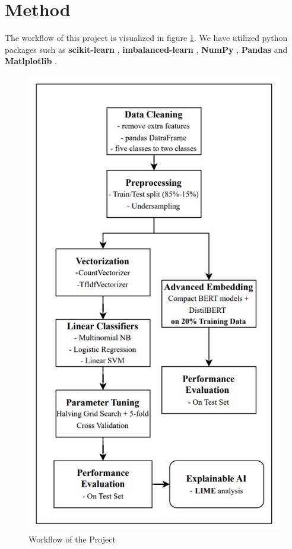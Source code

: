 \documentclass[11pt]{article}
\begin{document}
 \section{Method} 
 The workflow of this project is visualized in figure \ref{fig:workflow}. We have utilized python packages such as \textbf{scikit-learn} \cite{scikit-learn}, \textbf{imbalanced-learn} \cite{imblearn}, \textbf{NumPy} \cite{numpy}, \textbf{Pandas} \cite{pandas} \cite{pandassoft} and \textbf{Matlplotlib} \cite{matplotlib}.
 \begin{figure}
     \centering
     \includegraphics[scale=0.5]{figures/TM-workflow.png}
     \caption{Workflow of the Project}
     \label{fig:workflow}
 \end{figure}
\end{document}
